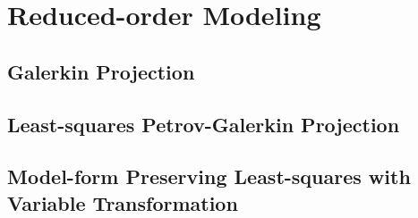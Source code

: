 \section{Reduced-order Modeling}

\subsection{Galerkin Projection}

\subsection{Least-squares Petrov-Galerkin Projection}

\subsection{Model-form Preserving Least-squares with Variable Transformation}

